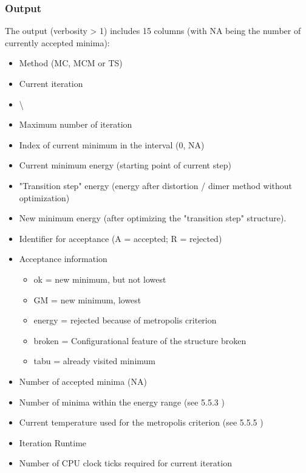 \documentclass[10pt,a4paper]{article} %
\newif\ifdevmode %
\begin{document}
	\subsubsection{Output}
	The output (verbosity > 1) includes 15 columns (with NA being the number of currently accepted minima):\\
	\begin{itemize}
		\item Method (MC, MCM or TS)
		\item Current iteration
		\item \textbackslash \ifdevmode \colorbox{red}{I guess that means blank line, does it?} \fi
		\item Maximum number of iteration
		\item Index of current minimum in the interval (0, NA)
		\item Current minimum energy (starting point of current step)
		\item "Transition step" energy (energy after distortion / dimer method without optimization)
		\item New minimum energy (after optimizing the "transition step" structure).
		\item Identifier for acceptance (A = accepted; R = rejected)
		\item Acceptance information
		\begin{itemize}
			\item ok = new minimum, but not lowest
			\item GM = new minimum, lowest
			\item energy = rejected because of metropolis criterion
			\item broken = Configurational feature of the structure broken
			\item tabu = already visited minimum
		\end{itemize}
		\item Number of accepted minima (NA)
		\item Number of minima within the energy range (see 5.5.3 \ifdevmode \colorbox{red}{This number needs to be updated} \fi)
		\item Current temperature used for the metropolis criterion (see 5.5.5 \ifdevmode \colorbox{red}{This number needs to be updated} \fi)
		\item Iteration Runtime
		\item Number of CPU clock ticks required for current iteration
	\end{itemize}
\end{document}
